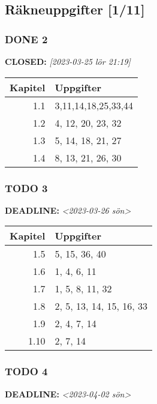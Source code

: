\documentclass[11pt]{article}
\begin{document}
\subsection{Räkneuppgifter [1/11]}
\label{sec:org91329df}
\subsubsection{{\bfseries\sffamily DONE} 2}
\label{sec:orgac81e4c}
\noindent\textbf{CLOSED:} \textit{[2023-03-25 lör 21:19]}\\[0pt]
\begin{center}
\begin{tabular}{rl}
Kapitel & Uppgifter\\[0pt]
\hline
1.1 & 3,11,14,18,25,33,44\\[0pt]
1.2 & 4, 12, 20, 23, 32\\[0pt]
1.3 & 5, 14, 18, 21, 27\\[0pt]
1.4 & 8, 13, 21, 26, 30\\[0pt]
\end{tabular}
\end{center}

\subsubsection{{\bfseries\sffamily TODO} 3}
\label{sec:orgc454214}
\noindent\textbf{DEADLINE:} \textit{<2023-03-26 sön>}\\[0pt]

\begin{center}
\begin{tabular}{rl}
Kapitel & Uppgifter\\[0pt]
\hline
1.5 & 5, 15, 36, 40\\[0pt]
1.6 & 1, 4, 6, 11\\[0pt]
1.7 & 1, 5, 8, 11, 32\\[0pt]
1.8 & 2, 5, 13, 14, 15, 16, 33\\[0pt]
1.9 & 2, 4, 7, 14\\[0pt]
1.10 & 2, 7, 14\\[0pt]
\end{tabular}
\end{center}


\subsubsection{{\bfseries\sffamily TODO} 4}
\label{sec:orgefe2d36}
\noindent\textbf{DEADLINE:} \textit{<2023-04-02 sön>}\\[0pt]
\end{document}
